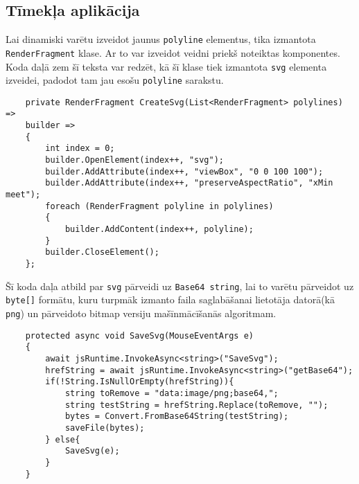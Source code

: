 \subsection{Tīmekļa aplikācija}

\par Lai dinamiski varētu izveidot jaunus \texttt{polyline} elementus, tika izmantota \texttt{RenderFragment} \cite{render_fragment}  klase. Ar to var izveidot veidni priekš noteiktas komponentes. Koda daļā zem šī teksta var redzēt, kā šī klase tiek izmantota \texttt{svg} elementa izveidei, padodot tam jau esošu \texttt{polyline} sarakstu.

{
\begin{verbatim}
    private RenderFragment CreateSvg(List<RenderFragment> polylines) =>
    builder =>
    {
        int index = 0;
        builder.OpenElement(index++, "svg");
        builder.AddAttribute(index++, "viewBox", "0 0 100 100");
        builder.AddAttribute(index++, "preserveAspectRatio", "xMin meet");
        foreach (RenderFragment polyline in polylines)
        {
            builder.AddContent(index++, polyline);
        }
        builder.CloseElement();
    };
\end{verbatim}
}

\par Šī koda daļa atbild par \texttt{svg} pārveidi uz \texttt{Base64 string}, lai to varētu pārveidot uz \texttt{byte[]} \cite{from_base_64_to_string} formātu, kuru turpmāk izmanto faila saglabāšanai lietotāja datorā(kā \texttt{png}) un pārveidoto bitmap versiju mašīnmācīšanās algoritmam.
{
\begin{verbatim}
    protected async void SaveSvg(MouseEventArgs e)
    {
        await jsRuntime.InvokeAsync<string>("SaveSvg");
        hrefString = await jsRuntime.InvokeAsync<string>("getBase64");
        if(!String.IsNullOrEmpty(hrefString)){
            string toRemove = "data:image/png;base64,";
            string testString = hrefString.Replace(toRemove, "");
            bytes = Convert.FromBase64String(testString);
            saveFile(bytes);
        } else{
            SaveSvg(e);
        }
    }
\end{verbatim}
}


